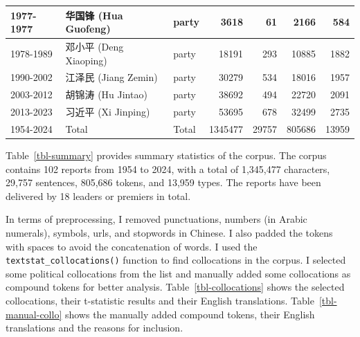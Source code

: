 \documentclass[
  letterpaper,
  abstract=true]{scrartcl}
\begin{document}
\begin{table}[H]
{\begin{tabular}[t]{l|l|l|r|r|r|r}
1977-1977 & 华国锋 (Hua Guofeng) & party & 3618 & 61 & 2166 & 584\\
\hline
1978-1989 & 邓小平 (Deng Xiaoping) & party & 18191 & 293 & 10885 & 1882\\
\hline
1990-2002 & 江泽民 (Jiang Zemin) & party & 30279 & 534 & 18016 & 1957\\
\hline
2003-2012 & 胡锦涛 (Hu Jintao) & party & 38692 & 494 & 22720 & 2091\\
\hline
2013-2023 & 习近平 (Xi Jinping) & party & 53695 & 678 & 32499 & 2735\\
\hline
1954-2024 & Total & Total & 1345477 & 29757 & 805686 & 13959\\
\hline
\end{tabular}

}

\end{table}%

Table~\ref{tbl-summary} provides summary statistics of the corpus. The
corpus contains 102 reports from 1954 to 2024, with a total of 1,345,477
characters, 29,757 sentences, 805,686 tokens, and 13,959 types. The
reports have been delivered by 18 leaders or premiers in total.

In terms of preprocessing, I removed punctuations, numbers (in Arabic
numerals), symbols, urls, and stopwords in Chinese. I also padded the
tokens with spaces to avoid the concatenation of words. I used the
\texttt{textstat\_collocations()} function to find collocations in the
corpus. I selected some political collocations from the list and
manually added some collocations as compound tokens for better analysis.
Table~\ref{tbl-collocations} shows the selected collocations, their
t-statistic results and their English translations.
Table~\ref{tbl-manual-collo} shows the manually added compound tokens,
their English translations and the reasons for inclusion.
\end{document}
